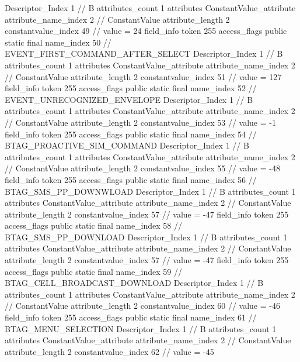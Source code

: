 {{{{{				Descriptor_Index	1		// B
				attributes_count	1
				attributes {
				ConstantValue_attribute {
					attribute_name_index	2		// ConstantValue
					attribute_length	2
					constantvalue_index	49		// value = 24
				}
				}
			}
			field_info {
				token	255
				access_flags	public static final
				name_index	50		// EVENT_FIRST_COMMAND_AFTER_SELECT
				Descriptor_Index	1		// B
				attributes_count	1
				attributes {
				ConstantValue_attribute {
					attribute_name_index	2		// ConstantValue
					attribute_length	2
					constantvalue_index	51		// value = 127
				}
				}
			}
			field_info {
				token	255
				access_flags	public static final
				name_index	52		// EVENT_UNRECOGNIZED_ENVELOPE
				Descriptor_Index	1		// B
				attributes_count	1
				attributes {
				ConstantValue_attribute {
					attribute_name_index	2		// ConstantValue
					attribute_length	2
					constantvalue_index	53		// value = -1
				}
				}
			}
			field_info {
				token	255
				access_flags	public static final
				name_index	54		// BTAG_PROACTIVE_SIM_COMMAND
				Descriptor_Index	1		// B
				attributes_count	1
				attributes {
				ConstantValue_attribute {
					attribute_name_index	2		// ConstantValue
					attribute_length	2
					constantvalue_index	55		// value = -48
				}
				}
			}
			field_info {
				token	255
				access_flags	public static final
				name_index	56		// BTAG_SMS_PP_DOWNWLOAD
				Descriptor_Index	1		// B
				attributes_count	1
				attributes {
				ConstantValue_attribute {
					attribute_name_index	2		// ConstantValue
					attribute_length	2
					constantvalue_index	57		// value = -47
				}
				}
			}
			field_info {
				token	255
				access_flags	public static final
				name_index	58		// BTAG_SMS_PP_DOWNLOAD
				Descriptor_Index	1		// B
				attributes_count	1
				attributes {
				ConstantValue_attribute {
					attribute_name_index	2		// ConstantValue
					attribute_length	2
					constantvalue_index	57		// value = -47
				}
				}
			}
			field_info {
				token	255
				access_flags	public static final
				name_index	59		// BTAG_CELL_BROADCAST_DOWNLOAD
				Descriptor_Index	1		// B
				attributes_count	1
				attributes {
				ConstantValue_attribute {
					attribute_name_index	2		// ConstantValue
					attribute_length	2
					constantvalue_index	60		// value = -46
				}
				}
			}
			field_info {
				token	255
				access_flags	public static final
				name_index	61		// BTAG_MENU_SELECTION
				Descriptor_Index	1		// B
				attributes_count	1
				attributes {
				ConstantValue_attribute {
					attribute_name_index	2		// ConstantValue
					attribute_length	2
					constantvalue_index	62		// value = -45
}}}}}}}
